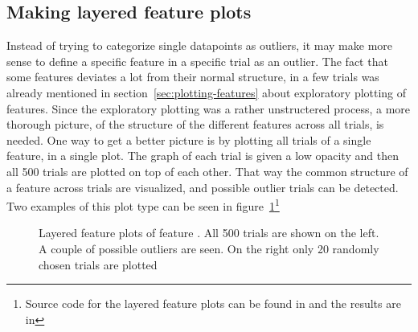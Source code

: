 \subsection{Making layered feature plots}
Instead of trying to categorize single datapoints as outliers, it may make more sense to define a specific feature in a specific trial as an outlier. The fact that some features deviates a lot from their normal structure, in a few trials was already mentioned in section~\ref{sec:plotting-features} about exploratory plotting of features. Since the exploratory plotting was a rather unstructered process, a more thorough picture, of the structure of the different features across all trials, is needed. One way to get a better picture is by plotting all trials of a single feature, in a single plot. The graph of each trial is given a low opacity and then all 500 trials are plotted on top of each other. That way the common structure of a feature across trials are visualized, and possible outlier trials can be detected. Two examples of this plot type can be seen in figure~\ref{fig:layered-feature-plots}\footnote{Source code for the layered feature plots can be found in  and the results are in } \par
\begin{figure}
    \centering
    \caption{Layered feature plots of feature . All 500 trials are shown on the left. A couple of possible outliers are seen. On the right only 20 randomly chosen trials are plotted}
    \label{fig:layered-feature-plots}
\end{figure}
